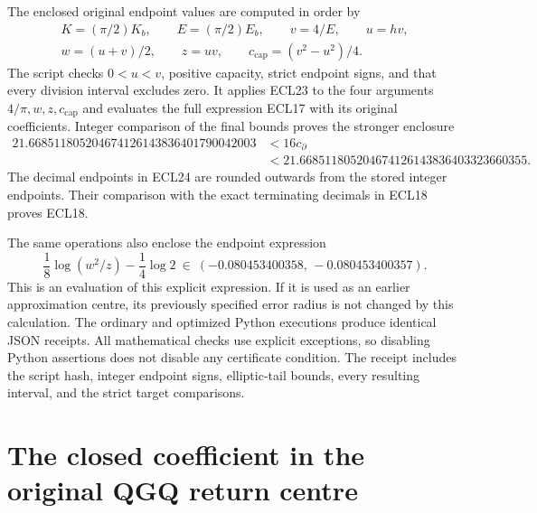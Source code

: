 \documentclass[11pt,a4paper]{article}
\begin{document}
The enclosed original endpoint values are computed in order by
\[
\begin{gathered}
K=(\pi/2)K_b,\qquad E=(\pi/2)E_b,\qquad v=4/E,\qquad u=hv,\\
w=(u+v)/2,\qquad z=uv,\qquad c_{\mathrm{cap}}=(v^2-u^2)/4.
\end{gathered}
\]
The script checks $0<u<v$, positive capacity, strict endpoint
signs, and that every division interval excludes zero. It applies
ECL23 to the four arguments $4/\pi,w,z,c_{\mathrm{cap}}$
and evaluates the full expression ECL17 with its original
coefficients. Integer comparison of the final bounds proves
the stronger enclosure
\begin{equation}\tag{ECL24}
\begin{split}
21.668511805204674126143836401790042003
&<16c_{\partial}\\
&<21.668511805204674126143836403323660355.
\end{split}
\end{equation}
The decimal endpoints in ECL24 are rounded outwards from the
stored integer endpoints. Their comparison with the exact
terminating decimals in ECL18 proves ECL18.

The same operations also enclose the endpoint expression
\begin{equation}\tag{ECL25}
\frac18\log(w^2/z)-\frac14\log2
\ \in\ (-0.080453400358,\,-0.080453400357).
\end{equation}
This is an evaluation of this explicit expression. If it is used
as an earlier approximation centre, its previously specified
error radius is not changed by this calculation.
The ordinary and optimized Python executions produce identical
JSON receipts. All mathematical checks use explicit exceptions,
so disabling Python assertions does not disable any certificate
condition. The receipt includes the script hash, integer endpoint
signs, elliptic-tail bounds, every resulting interval, and the
strict target comparisons.


\clearpage
\section{The closed coefficient in the original QGQ return centre}
\label{sec:EQR}
\end{document}
